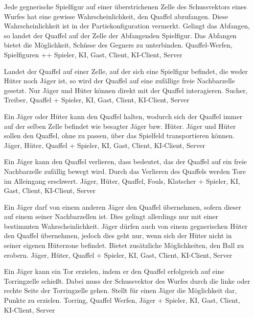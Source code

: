         {Jede gegnerische Spielfigur auf einer überstrichenen Zelle des Schussvektors eines Wurfes hat eine gewisse Wahrscheinlichkeit, den Quaffel abzufangen. Diese Wahrscheinlichkeit ist in der Partiekonfiguration vermerkt. Gelingt das Abfangen, so landet der Quaffel auf der Zelle der Abfangenden Spielfigur.}
        {Das Abfangen bietet die Möglichkeit, Schüsse des Gegners zu unterbinden.}
        {Quaffel-Werfen, Spielfiguren }
        {++}
        {Spieler, KI, Gast, Client, KI-Client, Server}
        
        {Landet der Quaffel auf einer Zelle, auf der sich eine Spielfigur befindet, die weder Hüter noch Jäger ist, so wird der Quaffel auf eine zufällige freie Nachbarzelle gesetzt.}
        {Nur Jäger und Hüter können direkt mit der Quaffel interagieren.}
        {Sucher, Treiber, Quaffel}
        {+}
        {Spieler, KI, Gast, Client, KI-Client, Server}		
        
        {Ein Jäger oder Hüter kann den Quaffel halten, wodurch sich der Quaffel immer auf der selben Zelle befindet wie besagter Jäger bzw. Hüter.}
        {Jäger und Hüter sollen den Quaffel, ohne zu passen, über das Spielfeld transportieren können.}
        {Jäger, Hüter, Quaffel}
        {+}
        {Spieler, KI, Gast, Client, KI-Client, Server}	
        
        {Ein Jäger kann den Quaffel verlieren, dass bedeutet, das der Quaffel auf ein freie Nachbarzelle zufällig bewegt wird.}
        {Durch das Verlieren des Quaffels werden Tore im Alleingang erschwert.}
        {Jäger, Hüter, Quaffel, Fouls, Klatscher}
        {+}
        {Spieler, KI, Gast, Client, KI-Client, Server}
    
        {Ein Jäger darf von einem anderen Jäger den Quaffel übernehmen, sofern dieser auf einem seiner Nachbarzellen ist. Dies gelingt allerdings nur mit einer bestimmten Wahrscheinlichkeit. Jäger dürfen auch von einem gegnerischen Hüter den Quaffel übernehmen, jedoch dies geht nur, wenn sich der Hüter nicht in seiner eigenen Hüterzone befindet.}
        {Bietet zusätzliche Möglichkeiten, den Ball zu erobern.}
        {Jäger, Hüter, Quaffel}
        {+}
        {Spieler, KI, Gast, Client, KI-Client, Server}

        {Ein Jäger kann ein Tor erzielen, indem er den Quaffel erfolgreich auf eine Torringzelle schießt. Dabei muss der Schussvektor des Wurfes durch die linke oder rechte Seite der Torringzelle gehen.}
        {Stellt für einen Jäger die Möglichkeit dar, Punkte zu erzielen.}
        {Torring, Quaffel Werfen, Jäger}
        {+}
        {Spieler, KI, Gast, Client, KI-Client, Server}
        

